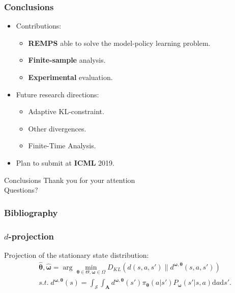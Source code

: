 \documentclass[english,aspectratio=1610]{beamer}
\theoremstyle{mystyle}
\theoremstyle{mystyle}
\theoremstyle{mystyle}
\begin{document}
\begin{frame}[t]
\frametitle{Conclusions}
\begin{itemize}
\item Contributions:
\begin{itemize}
	\item \textbf{REMPS} able to solve the model-policy learning problem.
	\item \textbf{Finite-sample} analysis.
	\item \textbf{Experimental} evaluation.
\end{itemize}
\item Future research directions:
\begin{itemize}
	\item Adaptive KL-constraint.
	\item Other divergences.
	\item Finite-Time Analysis.
\end{itemize}
\item Plan to submit at \textbf{ICML} 2019.
\end{itemize}
\end{frame}

\begin{frame}{Conclusions}
\centering
\LARGE Thank you for your attention\\
\vspace{2cm}
Questions?
\end{frame}

\begin{frame}[allowframebreaks]
        \frametitle{Bibliography}
        
        
\end{frame}

\begin{frame}
	\frametitle{$d$-projection}
	Projection of the stationary state distribution:
	\begin{align*}
	& \widehat{\bm{\theta}}, \widehat{\bm{\omega}} = \arg \min_{\bm{\theta} \in \Theta, \bm{\omega} \in \Omega} D_{KL} \left(d(s,a,s') \| d^{\bm{\omega}, \bm{\theta}}(s,a,s')\right)  \\
    & s.t. \; d^{\bm{\omega}, \bm{\theta}}(s) =\int_{\mathcal{S}} \int_{\bm{A}}d^{\bm{\omega}, \bm{\theta}}(s') \pi_{\bm{\theta}}(a|s') P_{\bm{\omega}}(s'|s,a) \mathrm{d}a \mathrm{d}s'.
\end{align*}
\end{frame}
\end{document}
